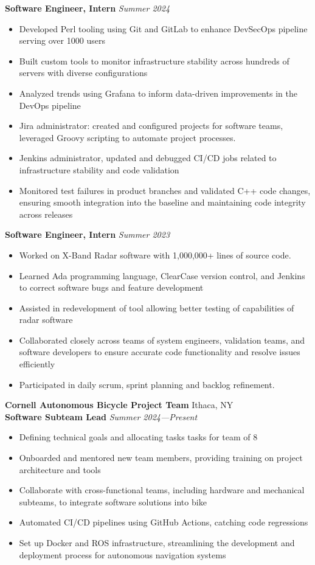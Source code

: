 \documentclass[letterpaper,10pt]{article}
\newcommand{\company}[2]{
    \vspace{6pt}
    {\large \textbf{#1}}
    \hfill
    {\normalsize {#2}}
    \\
}
\newcommand{\position}[2]{
    \vspace{4pt}
    {\normalsize \textbf {#1}}
    \hfill
    {\normalsize \textit{#2}}
    \\
}
\newcommand{\itemsBegin}{
    \begin{itemize}[leftmargin=0.2in, labelsep=0.05in, itemsep=0pt, parsep=1pt, topsep=0pt, partopsep=0pt]
}
\newcommand{\itemsEnd}{\end{itemize}}
\begin{document}
    \position{Software Engineer, Intern}{Summer 2024}
    \itemsBegin{}
        \item Developed Perl tooling using Git and GitLab to enhance DevSecOps pipeline serving over 1000 users
        \item Built custom tools to monitor infrastructure stability across hundreds of servers with diverse configurations
        \item Analyzed trends using Grafana to inform data-driven improvements in the DevOps pipeline
        \item Jira administrator: created and configured projects for software teams, leveraged Groovy scripting to automate project processes.
        \item Jenkins administrator, updated and debugged CI/CD jobs related to infrastructure stability and code validation
        \item Monitored test failures in product branches and validated C++ code changes, ensuring smooth integration into the baseline and maintaining code integrity across releases
    \itemsEnd{}

    \position{Software Engineer, Intern}{Summer 2023}
    \itemsBegin{}
        \item Worked on X-Band Radar software with 1,000,000+ lines of source code.
        \item Learned Ada programming language, ClearCase version control, and Jenkins to correct software bugs and feature development
        \item Assisted in redevelopment of tool allowing better testing of capabilities of radar software
        \item Collaborated closely across teams of system engineers, validation teams, and software developers to ensure accurate code functionality and resolve issues efficiently
        \item Participated in daily scrum, sprint planning and backlog refinement.
    \itemsEnd{}

    \company{Cornell Autonomous Bicycle Project Team}{Ithaca, NY}

    \position{Software Subteam Lead}{Summer 2024---Present}
    \itemsBegin{}
        \item Defining technical goals and allocating tasks tasks for team of 8
        \item Onboarded and mentored new team members, providing training on project architecture and tools
        \item Collaborate with cross-functional teams, including hardware and mechanical subteams, to integrate software solutions into bike
        \item Automated CI/CD pipelines using GitHub Actions, catching code regressions
        \item Set up Docker and ROS infrastructure, streamlining the development and deployment process for autonomous navigation systems
    \itemsEnd{}
\end{document}
